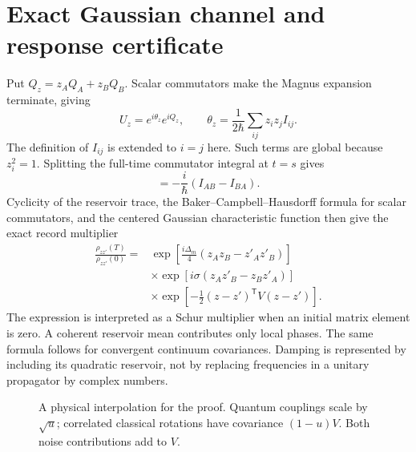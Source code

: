 \section{Exact Gaussian channel and response certificate}\label{app:channel}
Put $Q_z=z_AQ_A+z_BQ_B$. Scalar commutators make the Magnus expansion terminate, giving
\begin{equation}
U_z=e^{i\theta_z}e^{iQ_z},\qquad
\theta_z=\frac1{2\hbar}\sum_{ij}z_iz_jI_{ij}.
\label{eq:Uz}
\end{equation}
The definition of $I_{ij}$ is extended to $i=j$ here. Such terms are global because $z_i^2=1$. Splitting the full-time commutator integral at $t=s$ gives
\begin{equation}
[Q_A,Q_B]=-\frac i\hbar(I_{AB}-I_{BA}).
\label{eq:commQ}
\end{equation}
Cyclicity of the reservoir trace, the Baker--Campbell--Hausdorff formula for scalar commutators, and the centered Gaussian characteristic function then give the exact record multiplier
\begin{equation}
\begin{split}
\frac{\rho_{zz'}(T)}{\rho_{zz'}(0)}={}&\exp\left[\frac{i\Delta_m}4(z_Az_B-z'_Az'_B)\right]\\
&\times\exp\left[i\sigma(z_Az'_B-z_Bz'_A)\right]\\
&\times\exp\left[-\tfrac12(z-z')^{\mathsf T}V(z-z')\right].
\end{split}
\label{eq:multiplier}
\end{equation}
The expression is interpreted as a Schur multiplier when an initial matrix element is zero. A coherent reservoir mean contributes only local phases. The same formula follows for convergent continuum covariances. Damping is represented by including its quadratic reservoir, not by replacing frequencies in a unitary propagator by complex numbers.

\begin{figure}[t]
\centering
{}
\caption{A physical interpolation for the proof. Quantum couplings scale by $\sqrt u$; correlated classical rotations have covariance $(1-u)V$. Both noise contributions add to $V$.}
\label{fig:interpolation}
\end{figure}

